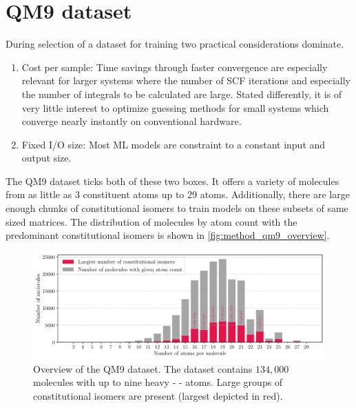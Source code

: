 \section{QM9 dataset}
\label{sec:dataset}
During selection of a dataset for training two practical considerations dominate. 
\begin{enumerate}
    \item Cost per sample: Time savings through faster convergence are especially relevant for larger systems where the number of SCF iterations and especially the number of integrals to be calculated are large. Stated differently, it is of very little interest to optimize guessing methods for small systems which converge nearly instantly on conventional hardware. 
    \item Fixed I/O size: Most ML models are constraint to a constant input and output size. 
\end{enumerate}

The QM9 dataset \parencite{ref:data_qm9, ref:article1_qm9,ref:article2_qm9} ticks both of these two boxes. It offers a variety of molecules from as little as 3 constituent atoms up to 29 atoms. Additionally, there are large enough chunks of constitutional isomers to train models on these subsets of same sized matrices. The distribution of molecules by atom count with the predominant constitutional isomers is shown in \autoref{fig:method_qm9_overview}.
\begin{figure}[H]
    \centering
    \includegraphics[width=\textwidth]{../fig/qm9_general/qm9_overview_stacked_bar.pdf}
    \caption[QM9 dataset overview]{Overview of the QM9 dataset. The dataset contains $134,000$ molecules with up to nine heavy -     - atoms. Large groups of constitutional isomers are present (largest depicted in red).}
    \label{fig:method_qm9_overview}
\end{figure}
